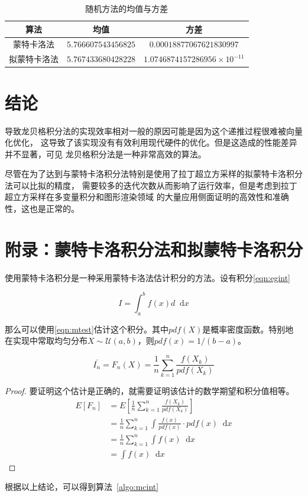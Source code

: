 \documentclass[a4paper,twoside]{article}
\newcommand*{\dif}{\mathop{}\!\mathrm{d}}
\begin{document}
\begin{spacing}{1.2}
\begin{table}
	\centering
	\begin{tabular}{ccc}
		\toprule
		算法 & 均值 & 方差 \\
		\midrule
		蒙特卡洛法 & $5.766607543456825$ & $0.00018877067621830997$ \\
		拟蒙特卡洛法 & $5.767433680428228$ & $1.0746874157286956\times 10^{-11}$ \\
		\bottomrule
	\end{tabular}
	\label{tbl:var}
	\caption{随机方法的均值与方差}
\end{table}

\section{结论}

导致龙贝格积分法的实现效率相对一般的原因可能是因为这个递推过程很难被向量化优化，
这导致了该实现没有有效利用现代硬件的优化。但是这造成的性能差异并不显著，可见
龙贝格积分法是一种非常高效的算法。

尽管在为了达到与蒙特卡洛积分法特别是使用了拉丁超立方采样的拟蒙特卡洛积分法可以比拟的精度，
需要较多的迭代次数从而影响了运行效率，但是考虑到拉丁超立方采样在多变量积分和图形渲染领域
的大量应用侧面证明的高效性和准确性，这也是正常的。


\clearpage

\appendix

\section{附录：蒙特卡洛积分法和拟蒙特卡洛积分}

使用蒙特卡洛积分是一种采用蒙特卡洛法估计积分的方法。设有积分\eqref{eqn:egint}

\begin{equation}
	\label{eqn:egint}
	I=\int_a^b f(x)d \dif x
\end{equation}

那么可以使用\eqref{eqn:mtest}估计这个积分。其中$pdf(X)$是概率密度函数。特别地
在实现中常取均匀分布$X\sim \mathcal{U}(a,b)$，则$pdf(x)=1/(b-a)$。

\begin{equation}
	\label{eqn:mtest}
	\bar{I_n}=F_n(X)=\frac{1}{n}\sum_{k=1}^n\frac{f(X_k)}{pdf(X_k)}
\end{equation}

\begin{proof}
	要证明这个估计是正确的，就需要证明该估计的数学期望和积分值相等。
\begin{align*}
	E[F_n]&=E\left[\frac{1}{n}\sum_{k=1}^n\frac{f(X_k)}{pdf(X_k)}\right]\\
	&=\frac{1}{n}\sum_{k=1}^n\int \frac{f(x)}{pdf(x)} \cdot pdf(x) \dif x\\
	&=\frac{1}{n}\sum_{k=1}^n\int f(x) \dif x\\
	&=\int f(x) \dif x
\end{align*}
\end{proof}
根据以上结论，可以得到算法~\ref{algo:mcint}


\end{spacing}
\end{document}
